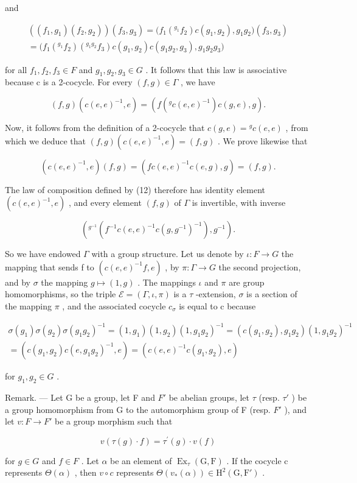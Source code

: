 and

\[
\begin{array}{c} ((f _ {1}, g _ {1}) (f _ {2}, g _ {2}))   (f _ {3}, g _ {3}) = \big (f _ {1} (^ {g _ {1}} f _ {2}) c (g _ {1}, g _ {2}), g _ {1} g _ {2} \big) (f _ {3}, g _ {3}) \\ = \big (f _ {1} (^ {g _ {1}} f _ {2}) (^ {g _ {1} g _ {2}} f _ {3}) c (g _ {1}, g _ {2}) c (g _ {1} g _ {2}, g _ {3}), g _ {1} g _ {2} g _ {3} \big) \end{array}
\]

for all \(f_{1}, f_{2}, f_{3} \in F\) and \(g_{1}, g_{2}, g_{3} \in G\) . It follows that this law is associative because c is a 2-cocycle. For every \((f, g) \in \Gamma\) , we have

\[
(f, g) (c (e, e) ^ {- 1}, e) = (f (^ {g} c (e, e) ^ {- 1}) c (g, e), g).
\]

Now, it follows from the definition of a 2-cocycle that \(c(g, e) = {}^g c(e, e)\) , from which we deduce that \((f, g)(c(e, e)^{-1}, e) = (f, g)\) . We prove likewise that

\[
(c (e, e) ^ {- 1}, e) (f, g) = (f c (e, e) ^ {- 1} c (e, g), g) = (f, g).
\]

The law of composition defined by (12) therefore has identity element \((c(e,e)^{-1},e)\) , and every element \((f,g)\) of \(\Gamma\) is invertible, with inverse

\[
\left(^ {g ^ {- 1}} (f ^ {- 1} c (e, e) ^ {- 1} c (g, g ^ {- 1}) ^ {- 1}), g ^ {- 1}\right).
\]

So we have endowed \(\Gamma\) with a group structure. Let us denote by \(\iota: F \to G\) the mapping that sends f to \((c(e, e)^{-1}f, e)\) , by \(\pi: \Gamma \to G\) the second projection, and by \(\sigma\) the mapping \(g \mapsto (1, g)\) . The mappings \(\iota\) and \(\pi\) are group homomorphisms, so the triple \(\mathcal{E} = (\Gamma, \iota, \pi)\) is a \(\tau\) -extension, \(\sigma\) is a section of the mapping \(\pi\) , and the associated cocycle \(c_{\sigma}\) is equal to c because

\[
\begin{array}{c} \sigma (g _ {1}) \sigma (g _ {2}) \sigma (g _ {1} g _ {2}) ^ {- 1} = (1, g _ {1}) (1, g _ {2}) (1, g _ {1} g _ {2}) ^ {- 1} = (c (g _ {1}, g _ {2}), g _ {1} g _ {2}) (1, g _ {1} g _ {2}) ^ {- 1} \\ = (c (g _ {1}, g _ {2}) c (e, g _ {1} g _ {2}) ^ {- 1}, e) = (c (e, e) ^ {- 1} c (g _ {1}, g _ {2}), e) \end{array}
\]

for \(g_{1}, g_{2} \in G\) .

Remark. --- Let G be a group, let F and \(F'\) be abelian groups, let \(\tau\) (resp. \(\tau'\) ) be a group homomorphism from G to the automorphism group of F (resp. \(F'\) ), and let \(v : F \to F'\) be a group morphism such that

\[
v (\tau (g) \cdot f) = \tau^ {\prime} (g) \cdot v (f)\tag{13}
\]

for \(g \in G\) and \(f \in F\) . Let \(\alpha\) be an element of \(\operatorname{Ex}_{\tau}(\mathrm{G}, \mathrm{F})\) . If the cocycle c represents \(\Theta(\alpha)\) , then \(v \circ c\) represents \(\Theta(v_{*}(\alpha)) \in \mathrm{H}^{2}(\mathrm{G}, \mathrm{F}')\) .

